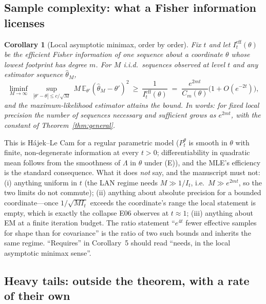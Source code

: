 \documentclass[11pt,a4paper]{article}
\newcommand{\E}{\mathbb{E}}
\newtheorem{corollary}[theorem]{Corollary}
\theoremstyle{definition}
\theoremstyle{remark}
\begin{document}
\subsection{Sample complexity: what a Fisher information licenses}

\begin{corollary}[Local asymptotic minimax, order by order]
\label{cor:lam}
Fix $t$ and let $I_t^{\mathrm{eff}}(\theta)$ be the efficient Fisher information of one sequence about a coordinate $\theta$ whose lowest footprint has degree $m$. For $M$ i.i.d.\ sequences observed at level $t$ and any estimator sequence $\hat\theta_M$,
\[
 \liminf_{M\to\infty}\ \sup_{|\theta'-\theta|\le c/\sqrt M}\ M\,\E_{\theta'}(\hat\theta_M-\theta')^2\ \ge\ \frac{1}{I_t^{\mathrm{eff}}(\theta)}
 \;=\;\frac{e^{2mt}}{C_m(\theta)}\bigl(1+O(e^{-2t})\bigr),
\]
and the maximum-likelihood estimator attains the bound. In words: for fixed local precision the number of sequences \emph{necessary and sufficient} grows as $e^{2mt}$, with the constant of Theorem~\ref{thm:general}.
\end{corollary}
\noindent This is H\'ajek--Le Cam for a regular parametric model ($P_t^\theta$ is smooth in $\theta$ with finite, non-degenerate information at every $t>0$; differentiability in quadratic mean follows from the smoothness of $\Lambda$ in $\theta$ under (E)), and the MLE's efficiency is the standard consequence. What it does \emph{not} say, and the manuscript must not: (i) anything uniform in $t$ (the LAN regime needs $M\gg1/I_t$, i.e.\ $M\gg e^{2mt}$, so the two limits do not commute); (ii) anything about absolute precision for a bounded coordinate---once $1/\sqrt{MI_t}$ exceeds the coordinate's range the local statement is empty, which is exactly the collapse E06 observes at $t\approx1$; (iii) anything about EM at a finite iteration budget. The ratio statement ``$e^{4t}$ fewer effective samples for shape than for covariance'' is the ratio of two such bounds and inherits the same regime. ``Requires'' in Corollary~5 should read ``needs, in the local asymptotic minimax sense''.

\subsection{Heavy tails: outside the theorem, with a rate of their own}
\end{document}
